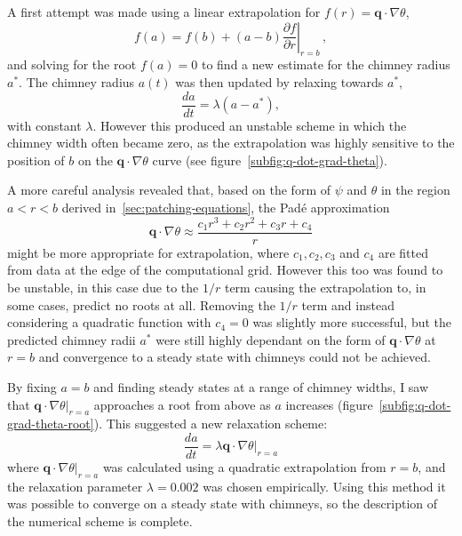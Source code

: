 \documentclass[11pt]{proc}
\begin{document}
A first attempt was made using a linear extrapolation for $f(r) = \mathbf{q} \cdot \nabla \theta$,
\begin{equation}
f(a) = f(b) + (a-b) \left. \frac{\partial f}{\partial r}\right|_{r=b} \, ,
\end{equation}
and solving for the root $f(a)=0$ to find a new estimate for the chimney radius $a^*$. The chimney radius $a(t)$ was then updated by relaxing towards $a^*$,
\begin{equation}
\frac{da}{dt} = \lambda (a - a^*),
\end{equation}
with constant $\lambda$. However this produced an unstable scheme in which the chimney width often became zero, as the extrapolation was highly sensitive to the position of $b$ on the $\mathbf{q} \cdot \nabla \theta$ curve (see figure~\ref{subfig:q-dot-grad-theta}).

A more careful analysis revealed that, based on the form of $\psi$ and $\theta$ in the region $a < r < b$ derived in~\autoref{sec:patching-equations}, the Pad\'{e} approximation
\begin{equation}
\mathbf{q} \cdot \nabla \theta \approx \frac{c_1 r^3 + c_2 r^2 + c_3 r + c_4}{r}
\end{equation}
might be more appropriate for extrapolation, where $c_1, c_2, c_3$ and $c_4$ are fitted from data at the edge of the computational grid. However this too was found to be unstable, in this case due to the $1/r$ term causing the extrapolation to, in some cases, predict no roots at all. Removing the $1/r$ term and instead considering a quadratic function with $c_4=0$ was slightly more successful, but the predicted chimney radii $a^*$ were still highly dependant on the form of $\mathbf{q} \cdot \nabla \theta$ at $r=b$ and convergence to a steady state with chimneys could not be achieved.

By fixing $a=b$ and finding steady states at a range of chimney widths, I saw that $\left. \mathbf{q} \cdot \nabla \theta \right|_{r=a}$ approaches a root from above as $a$ increases (figure~\ref{subfig:q-dot-grad-theta-root}). This suggested a new relaxation scheme:
\begin{equation}
\label{eq:relaxation-q-dot-grad-theta}
\frac{da}{dt} = \lambda \left. \mathbf{q} \cdot \nabla \theta \right|_{r=a}
\end{equation}
where $\left. \mathbf{q} \cdot \nabla \theta \right|_{r=a}$ was calculated using a quadratic extrapolation from $r=b$, and the relaxation parameter $\lambda = 0.002$ was chosen empirically. Using this method it was possible to converge on a steady state with chimneys, so the description of the numerical scheme is complete.
\end{document}
